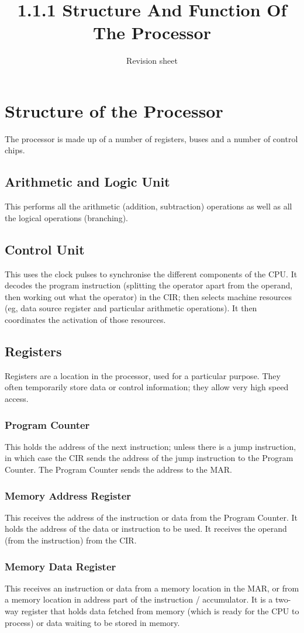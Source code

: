 \documentclass[a4paper,11pt, twocolumn]{article}
\title{1.1.1 Structure And Function Of The Processor}
\author{Revision sheet}
\date{}
\begin{document}
\maketitle
\thispagestyle{fancy}

\section{Structure of the Processor}
The processor is made up of a number of registers, buses and a number of control chips.
\subsection{Arithmetic and Logic Unit}
This performs all the arithmetic (addition, subtraction) operations as well as all the logical operations (branching).
\subsection{Control Unit}
This uses the clock pulses to synchronise the different components of the CPU. It decodes the program instruction (splitting the operator apart from the operand, then working out what the operator) in the CIR; then selects machine resources (eg, data source register and particular arithmetic operations). It then coordinates the activation of those resources.
\subsection{Registers}
Registers are a location in the processor, used for a particular purpose. They often temporarily store data or control information; they allow very high speed access.
\subsubsection{Program Counter}
This holds the address of the next instruction; unless there is a jump instruction, in which case the CIR sends the address of the jump instruction to the Program Counter. The Program Counter sends the address to the MAR.
\subsubsection{Memory Address Register}
This receives the address of the instruction or data from the Program Counter. It holds the address of the data or instruction to be used. It receives the operand (from the instruction) from the CIR.
\subsubsection{Memory Data Register}
This receives an instruction or data from a memory location in the MAR, or from a memory location in address part of the instruction / accumulator. It is a two-way register that holds data fetched from memory (which is ready for the CPU to process) or data waiting to be stored in memory.
\end{document}
